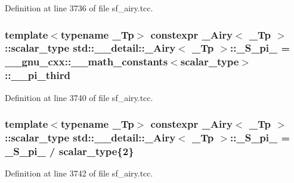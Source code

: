 Definition at line 3736 of file sf\+\_\+airy.\+tcc.

\subsubsection[{\texorpdfstring{\+\_\+\+S\+\_\+pi\+\_\+3}{_S_pi_3}}]{\setlength{\rightskip}{0pt plus 5cm}template$<$typename \+\_\+\+Tp$>$ constexpr {\bf \+\_\+\+Airy}$<$ \+\_\+\+Tp $>$\+::{\bf scalar\+\_\+type} {\bf std\+::\+\_\+\+\_\+detail\+::\+\_\+\+Airy}$<$ \+\_\+\+Tp $>$\+::\+\_\+\+S\+\_\+pi\+\_ = \+\_\+\+\_\+gnu\+\_\+cxx\+::\+\_\+\+\_\+math\+\_\+constants$<${\bf scalar\+\_\+type}$>$\+::\+\_\+\+\_\+pi\+\_\+third\hspace{0.3cm}{\ttfamily [static]}}\hypertarget{classstd_1_1____detail_1_1__Airy_a2050b1922ed0b79c5231ada9dffc77e5}{}\label{classstd_1_1____detail_1_1__Airy_a2050b1922ed0b79c5231ada9dffc77e5}


Definition at line 3740 of file sf\+\_\+airy.\+tcc.

\subsubsection[{\texorpdfstring{\+\_\+\+S\+\_\+pi\+\_\+6}{_S_pi_6}}]{\setlength{\rightskip}{0pt plus 5cm}template$<$typename \+\_\+\+Tp$>$ constexpr {\bf \+\_\+\+Airy}$<$ \+\_\+\+Tp $>$\+::{\bf scalar\+\_\+type} {\bf std\+::\+\_\+\+\_\+detail\+::\+\_\+\+Airy}$<$ \+\_\+\+Tp $>$\+::\+\_\+\+S\+\_\+pi\+\_ = {\bf \+\_\+\+S\+\_\+pi\+\_} / {\bf scalar\+\_\+type}\{2\}\hspace{0.3cm}{\ttfamily [static]}}\hypertarget{classstd_1_1____detail_1_1__Airy_ab43a77e34022fb3e772ef6504bf9319e}{}\label{classstd_1_1____detail_1_1__Airy_ab43a77e34022fb3e772ef6504bf9319e}


Definition at line 3742 of file sf\+\_\+airy.\+tcc.

